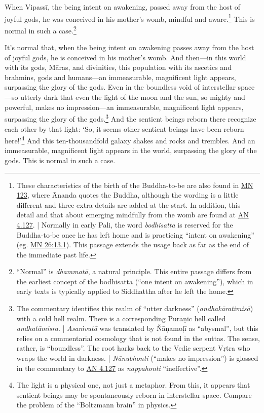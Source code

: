 \documentclass[12pt,openany]{book}%
\begin{document}
When \textsanskrit{Vipassī}, the being intent on awakening, passed away from the host of joyful gods, he was conceived in his mother’s womb, mindful and aware.\footnote{These characteristics of the birth of the Buddha-to-be are also found in \href{https://suttacentral.net/mn123/en/sujato}{MN 123}, where Ānanda quotes the Buddha, although the wording is a little different and three extra details are added at the start. In addition, this detail and that about emerging mindfully from the womb are found at \href{https://suttacentral.net/an4.127/en/sujato}{AN 4.127}. | Normally in early Pali, the word \textit{bodhisatta} is reserved for the Buddha-to-be once he has left home and is practicing “intent on awakening” (eg. \href{https://suttacentral.net/mn26/en/sujato\#13.1}{MN 26:13.1}). This passage extends the usage back as far as the end of the immediate past life. } This is normal in such a case.\footnote{“Normal” is \textit{\textsanskrit{dhammatā}}, a natural principle. This entire passage differs from the earliest concept of the bodhisatta (“one intent on awakening”), which in early texts is typically applied to Siddhattha after he left the home. } 

It’s normal that, when the being intent on awakening passes away from the host of joyful gods, he is conceived in his mother’s womb. And then—in this world with its gods, \textsanskrit{Māras}, and divinities, this population with its ascetics and brahmins, gods and humans—an immeasurable, magnificent light appears, surpassing the glory of the gods. Even in the boundless void of interstellar space—so utterly dark that even the light of the moon and the sun, so mighty and powerful, makes no impression—an immeasurable, magnificent light appears, surpassing the glory of the gods.\footnote{The commentary identifies this realm of “utter darkness” (\textit{\textsanskrit{andhakāratimisā}}) with a cold hell realm. There is a corresponding \textsanskrit{Purāṇic} hell called \textit{\textsanskrit{andhatāmisra}}. | \textit{\textsanskrit{Asaṁvutā}} was translated by \textsanskrit{Ñāṇamoḷī} as “abysmal”, but this relies on a commentarial cosmology that is not found in the suttas. The sense, rather, is “boundless”. The root harks back to the Vedic serpent \textsanskrit{Vṛtra} who wraps the world in darkness. | \textit{\textsanskrit{Nānubhonti}} (“makes no impression”) is glossed in the commentary to \href{https://suttacentral.net/an4.127/en/sujato}{AN 4.127} as \textit{nappahonti} “ineffective”. } And the sentient beings reborn there recognize each other by that light: ‘So, it seems other sentient beings have been reborn here!’\footnote{The light is a physical one, not just a metaphor. From this, it appears that sentient beings may be spontaneously reborn in interstellar space. Compare the problem of the “Boltzmann brain” in physics. } And this ten-thousandfold galaxy shakes and rocks and trembles. And an immeasurable, magnificent light appears in the world, surpassing the glory of the gods. This is normal in such a case. 
\end{document}
